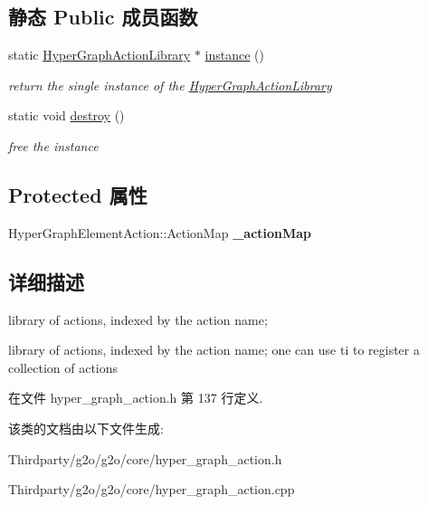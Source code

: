 \subsection*{静态 Public 成员函数}
\begin{DoxyCompactItemize}
\item 
\hypertarget{classg2o_1_1HyperGraphActionLibrary_a12074e3f4d9bcb3da20a4fe23d18b745}{static \hyperlink{classg2o_1_1HyperGraphActionLibrary}{Hyper\-Graph\-Action\-Library} $\ast$ \hyperlink{classg2o_1_1HyperGraphActionLibrary_a12074e3f4d9bcb3da20a4fe23d18b745}{instance} ()}\label{classg2o_1_1HyperGraphActionLibrary_a12074e3f4d9bcb3da20a4fe23d18b745}

\begin{DoxyCompactList}\small\item\em return the single instance of the \hyperlink{classg2o_1_1HyperGraphActionLibrary}{Hyper\-Graph\-Action\-Library} \end{DoxyCompactList}\item 
\hypertarget{classg2o_1_1HyperGraphActionLibrary_aa235ae7c242c522518b07d019dbf8a51}{static void \hyperlink{classg2o_1_1HyperGraphActionLibrary_aa235ae7c242c522518b07d019dbf8a51}{destroy} ()}\label{classg2o_1_1HyperGraphActionLibrary_aa235ae7c242c522518b07d019dbf8a51}

\begin{DoxyCompactList}\small\item\em free the instance \end{DoxyCompactList}\end{DoxyCompactItemize}
\subsection*{Protected 属性}
\begin{DoxyCompactItemize}
\item 
\hypertarget{classg2o_1_1HyperGraphActionLibrary_afc9e9b39a743700dcfc896b50d176b3b}{Hyper\-Graph\-Element\-Action\-::\-Action\-Map {\bfseries \-\_\-action\-Map}}\label{classg2o_1_1HyperGraphActionLibrary_afc9e9b39a743700dcfc896b50d176b3b}

\end{DoxyCompactItemize}


\subsection{详细描述}
library of actions, indexed by the action name; 

library of actions, indexed by the action name; one can use ti to register a collection of actions 

在文件 hyper\-\_\-graph\-\_\-action.\-h 第 137 行定义.



该类的文档由以下文件生成\-:\begin{DoxyCompactItemize}
\item 
Thirdparty/g2o/g2o/core/hyper\-\_\-graph\-\_\-action.\-h\item 
Thirdparty/g2o/g2o/core/hyper\-\_\-graph\-\_\-action.\-cpp\end{DoxyCompactItemize}
